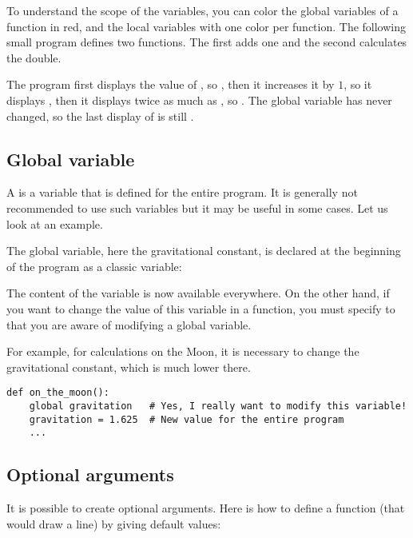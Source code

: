 \documentclass[11pt,class=report,crop=false]{standalone}
\begin{document}
To understand the scope of the variables, you can color the global variables of a function in red, and the local variables with one color per function.
The following small program defines two functions. The first adds one and the second calculates the double.


The program first displays the value of , so , then it increases it by $1$, so it displays , then it displays twice as much as , so . The global variable  has never changed, so the last display of  is still .

\subsection{Global variable}

A  is a variable that is defined for the entire program. It is generally not recommended to use such variables but it may be useful in some cases. Let us look at an example.

The global variable, here the gravitational constant, is declared at the beginning of the program as a classic variable: 

The content of the variable  is now available everywhere.
On the other hand, if you want to change the value of this variable in a function, you must specify to \Python{} that you are aware of modifying a global variable.

For example, for calculations on the Moon, it is necessary to change the gravitational constant, which is much lower there.

\begin{lstlisting}
def on_the_moon():
    global gravitation   # Yes, I really want to modify this variable!
    gravitation = 1.625  # New value for the entire program
    ...
\end{lstlisting}

\subsection{Optional arguments}


It is possible to create optional arguments. Here is how to define a function (that would draw a line) by giving default values:
 
\end{document}
